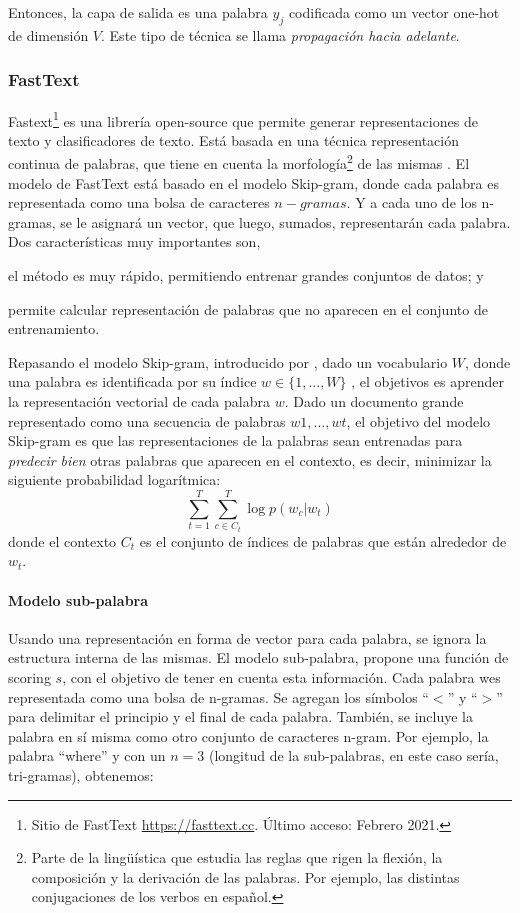 \bigskip Entonces, la capa de salida es una palabra \(y_j\) codificada como un vector one-hot de dimensión \(V\). Este tipo de técnica se llama \textit{propagación hacia adelante}.

\subsubsection{FastText}
Fastext\footnote{Sitio de FastText \url{https://fasttext.cc}. Último acceso: Febrero 2021.} es una librería open-source que permite generar representaciones de texto y clasificadores de texto. Está basada en una técnica representación continua de palabras, que tiene en cuenta la morfología\footnote{Parte de la lingüística que estudia las reglas que rigen la flexión, la composición y la derivación de las palabras. Por ejemplo, las distintas conjugaciones de los verbos en español.} de las mismas \citep{bojanowski2017enriching}.
El modelo de FastText está basado en el modelo Skip-gram, donde cada palabra es representada como una bolsa de caracteres \(n-gramas\). Y a cada uno de los n-gramas, se le asignará un vector, que luego, sumados, representarán cada palabra. Dos características muy importantes son, \begin{enumerate*} [label=(\roman*)] \item el método es muy rápido, permitiendo entrenar grandes conjuntos de datos; y \item permite calcular representación de palabras que no aparecen en el conjunto de entrenamiento.  \end{enumerate*}

\bigskip Repasando el modelo Skip-gram, introducido por \cite{mikolov2013efficient}, dado un vocabulario \(W\), donde una palabra es identificada por su índice \(w \in \{1,... , W\}\) , el objetivos es aprender la representación vectorial de cada palabra \(w\). Dado un documento grande representado como una secuencia de palabras \(w1, ..., wt\), el objetivo del modelo Skip-gram es que las representaciones de la palabras sean entrenadas para \textit{predecir bien} otras palabras que aparecen en el contexto, es decir, minimizar la siguiente probabilidad logarítmica:
\[\sum_{t=1}^{T}\sum_{c \in C_t}^{T}{\log p(w_c | w_t)}\]
donde el contexto \(C_t\) es el conjunto de índices de palabras que están alrededor de \(w_t\).

\paragraph{Modelo sub-palabra}
Usando una representación en forma de vector para cada palabra, se ignora la estructura interna de las mismas. El modelo sub-palabra, propone una función de scoring \(s\), con el objetivo de tener en cuenta esta información.
Cada palabra wes representada como una bolsa de n-gramas. Se agregan los símbolos ``\(<\)'' y ``\(>\)'' para delimitar el principio y el final de cada palabra. También, se incluye la palabra en sí misma como otro conjunto de caracteres n-gram. Por ejemplo, la palabra ``where'' y con un \(n = 3\) (longitud de la sub-palabras, en este caso sería, tri-gramas), obtenemos:

